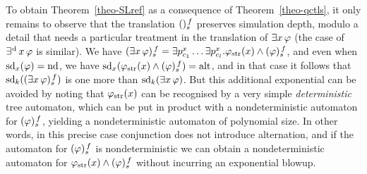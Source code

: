To obtain Theorem~\ref{theo-SLref} as a consequence of Theorem~\ref{theo-qctls}, it only remains to observe that
the translation $\tr{}$ preserves simulation depth, modulo a
detail that needs a particular treatment in the translation of
$\exists \var\,\phi$ (the case of $\existsd \var\,\phi$ is similar).
We have  $\tr{\exists \var\,\phi}=\exists p_{\mov_{1}}^{\var}\ldots \exists
                                  p_{\mov_{\maxmov}}^{\var}. \phistrat
                                  \et \tr[f]{\phi}$,
                                  and even when
$\ndd_x(\phi)=\nd$, we have  $\ndd_x(\phistrat\wedge\tr{\phi})=\alt$,
and in that case it follows that $\ndd_k(\tr{\exists\var\,\phi})$ is
one more than $\ndd_k(\exists\var\,\phi)$. But this additional
exponential can be avoided by noting that $\phistrat$ can be
recognised by a very simple \emph{deterministic} tree automaton, which
can be put in product with a nondeterministic automaton for
$\tr{\phi}$, yielding a nondeterministic automaton of polynomial
size. In other words, in this precise case conjunction does not
introduce alternation, and if the automaton for $\tr{\phi}$ is
nondeterministic we can obtain a nondeterministic automaton for
$\phistrat\wedge\tr{\phi}$ without incurring an exponential blowup.



